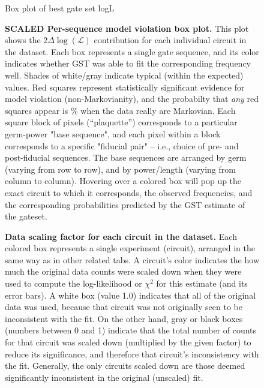 \documentclass{article}[11pt]
\newcommand{\putfield}[2]{#2}
\begin{document}
{{{\begin{figure}
  \begin{center}
    \begin{adjustbox}{max width=\textwidth}
      \putfield{final_model_fit_colorbox_plot_scl}{Box plot of best gate set logL}
    \end{adjustbox}
    \caption{\textbf{SCALED Per-sequence model violation box plot.}  This plot shows the $2\Delta\log(\mathcal{L})$ contribution for each individual circuit in the dataset.  Each box represents a single gate sequence, and its color indicates whether GST was able to fit the corresponding frequency well.  Shades of white/gray indicate typical (within the expected) values. Red squares represent statistically significant evidence for model violation (non-Markovianity), and the probabilty that \emph{any} red squares appear is \putfield{linlg_pcntle}{}\% when the data really are Markovian. Each square block of pixels (``plaquette'') corresponds to a particular germ-power "base sequence", and each pixel within a block corresponds to a specific "fiducial pair" -- i.e., choice of pre- and post-fiducial sequences.  The base sequences are arranged by germ (varying from row to row), and by power/length (varying from column to column).  Hovering over a colored box will pop up the exact circuit to which it corresponds, the observed frequencies, and the corresponding probabilities predicted by the GST estimate of the gateset.\label{final_model_fit_colorbox_plot}}
\end{center}
\end{figure}

}{}

\begin{figure}
  \begin{center}
    \putfield{data_scaling_colorbox_plot}{}
    \caption{\textbf{Data scaling factor for each circuit in the dataset.}  Each colored box represents a single experiment (circuit), arranged in the same way as in other related tabs.  A circuit's color indicates the how much the original data counts were scaled down when they were used to compute the log-likelihood or $\chi^2$ for this estimate (and its error bars).  A white box (value 1.0) indicates that all of the original data was used, because that circuit was not originally seen to be inconsistent with the fit. On the other hand, gray or black boxes (numbers between 0 and 1) indicate that the total number of counts for that circuit was scaled down (multiplied by the given factor) to reduce its significance, and therefore that circuit's inconsistency with the fit.  Generally, the only circuits scaled down are those deemed significantly inconsistent in the original (unscaled) fit.
    }
  \end{center}
\end{figure}

}}
\end{document}
